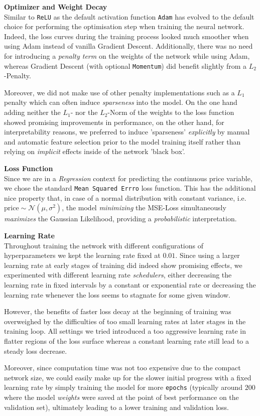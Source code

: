 \documentclass[12pt, letterpaper]{article}
\begin{document}
\textbf{Optimizer and Weight Decay} \\
Similar to \texttt{ReLU} as the default activation function \texttt{Adam} has evolved to the default choice for performing the optimisation step when training the neural network.
Indeed, the loss curves during the training process looked much smoother when using Adam instead of vanilla Gradient Descent.
Additionally, there was no need for introducing a \emph{penalty term} on the weights of the network while using Adam, whereas Gradient Descent (with optional \texttt{Momentum}) did benefit slightly from a $L_2$-Penalty.

Moreover, we did not make use of other penalty implementations such as a $L_1$ penalty which can often induce \emph{sparseness} into the model.
On the one hand adding neither the $L_1$- nor the $L_2$-Norm of the weights to the loss function showed promising improvements in performance, on the other hand, for interpretability reasons, we preferred to induce 'sparseness' \emph{explicitly} by manual and automatic feature selection prior to the model training itself rather than relying on \emph{implicit} effects inside of the network 'black box'.

\textbf{Loss Function} \\
Since we are in a \emph{Regression} context for predicting the continuous price variable, we chose the standard \texttt{Mean Squared Errro} loss function.
This has the additional nice property that, in case of a normal distribution with constant variance, i.e. $\text{price} \sim \mathcal{N} \left(\mu, \sigma^2 \right)$, the model \emph{minimizing} the MSE-Loss simultaneously \emph{maximizes} the Gaussian Likelihood, providing a \emph{probabilistic} interpretation.

\textbf{Learning Rate} \\
Throughout training the network with different configurations of hyperparameters we kept the learning rate fixed at $0.01$.
Since using a larger learning rate at early stages of training did indeed show promising effects, we experimented with different learning rate \emph{schedulers}, either decreasing the learning rate in fixed intervals by a constant or exponential rate or decreasing the learning rate whenever the loss seems to stagnate for some given window.

However, the benefits of faster loss decay at the beginning of training was overweighed by the difficulties of too small learning rates at later stages in the training loop.
All settings we tried introduced a too aggressive learning rate in flatter regions of the loss surface whereas a constant learning rate still lead to a steady loss decrease.

Moreover, since computation time was not too expensive due to the compact network size, we could easily make up for the slower initial progress with a fixed learning rate by simply training the model for more \texttt{epochs} (typically around $200$ where the model \emph{weights} were saved at the point of best performance on the validation set), ultimately leading to a lower training and validation loss.


\newpage



\end{document}
